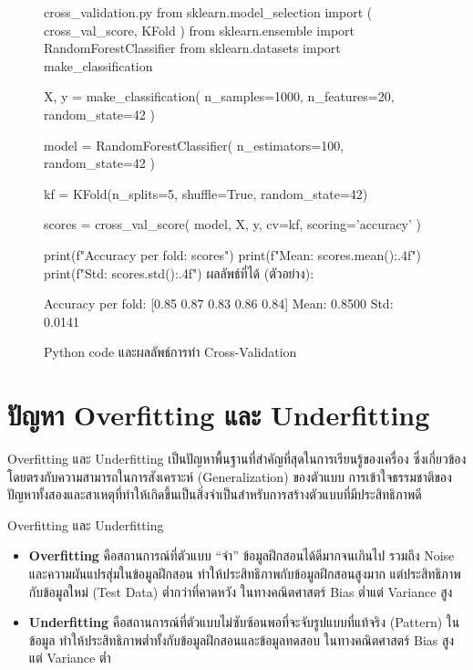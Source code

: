 \begin{figure}[h]
\begin{pycode}{cross\_validation.py}
from sklearn.model_selection import (
    cross_val_score, KFold
)
from sklearn.ensemble import RandomForestClassifier
from sklearn.datasets import make_classification

X, y = make_classification(
    n_samples=1000, n_features=20,
    random_state=42
)

model = RandomForestClassifier(
    n_estimators=100, random_state=42
)

kf = KFold(n_splits=5, shuffle=True,
           random_state=42)

scores = cross_val_score(
    model, X, y, cv=kf, scoring='accuracy'
)

print(f"Accuracy per fold: {scores}")
print(f"Mean: {scores.mean():.4f}")
print(f"Std: {scores.std():.4f}")
\tcblower
ผลลัพธ์ที่ได้ (ตัวอย่าง):

Accuracy per fold: [0.85 0.87 0.83 0.86 0.84]
Mean: 0.8500
Std: 0.0141
\end{pycode}
\caption{Python code และผลลัพธ์การทำ Cross-Validation}
\label{fig:cv_code}
\end{figure}

\section{ปัญหา Overfitting และ Underfitting}
Overfitting และ Underfitting เป็นปัญหาพื้นฐานที่สำคัญที่สุดในการเรียนรู้ของเครื่อง ซึ่งเกี่ยวข้องโดยตรงกับความสามารถในการสังเคราะห์ (Generalization) ของตัวแบบ การเข้าใจธรรมชาติของปัญหาทั้งสองและสาเหตุที่ทำให้เกิดขึ้นเป็นสิ่งจำเป็นสำหรับการสร้างตัวแบบที่มีประสิทธิภาพดี

\begin{myLimit}[]{Overfitting และ Underfitting}{}
\begin{itemize}
\item \textbf{Overfitting} คือสถานการณ์ที่ตัวแบบ ``จำ'' ข้อมูลฝึกสอนได้ดีมากจนเกินไป รวมถึง Noise และความผันแปรสุ่มในข้อมูลฝึกสอน ทำให้ประสิทธิภาพกับข้อมูลฝึกสอนสูงมาก แต่ประสิทธิภาพกับข้อมูลใหม่ (Test Data) ต่ำกว่าที่คาดหวัง ในทางคณิตศาสตร์ Bias ต่ำแต่ Variance สูง

\item \textbf{Underfitting} คือสถานการณ์ที่ตัวแบบไม่ซับซ้อนพอที่จะจับรูปแบบที่แท้จริง (Pattern) ในข้อมูล ทำให้ประสิทธิภาพต่ำทั้งกับข้อมูลฝึกสอนและข้อมูลทดสอบ ในทางคณิตศาสตร์ Bias สูงแต่ Variance ต่ำ
\end{itemize}
\end{myLimit}

